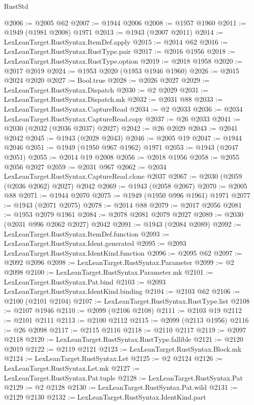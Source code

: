 \begin{lexlean}{RustStd}
\begin{coremodule}
@2006 := @2005 @62
@2007 := @1944 @2006
@2008 := @1957 @1960
@2011 := @1949 (@1981 @2008) @1971
@2013 := @1943 (@2007 @2011)
@2014 := LexLeanTarget.RustSyntax.ItemDef.apply
@2015 := @2014 @62
@2016 := LexLeanTarget.RustSyntax.RustType.pair
@2017 := @2016 @1956
@2018 := LexLeanTarget.RustSyntax.RustType.option
@2019 := @2018 @1958
@2020 := @2017 @2019
@2024 := @1953 @2020 (@1953 @1946 @1960)
@2026 := @2015 @2024 @2020
@2027 := Bool.true
@2028 := @2026 @2027
@2029 := LexLeanTarget.RustSyntax.Dispatch
@2030 := @2 @2029
@2031 := LexLeanTarget.RustSyntax.Dispatch.mk
@2032 := @2031 @88
@2033 := LexLeanTarget.RustSyntax.CaptureRead
@2034 := @2 @2033
@2036 := @2034 LexLeanTarget.RustSyntax.CaptureRead.copy
@2037 := @26 @2033
@2041 := @2030 (@2032 (@2036 @2037) @2027)
@2042 := @26 @2029
@2043 := @2041 @2042
@2045 := @1943 (@2028 @2043)
@2046 := @2005 @19
@2047 := @1944 @2046
@2051 := @1949 (@1950 @967 @1962) @1971
@2053 := @1943 (@2047 @2051)
@2055 := @2014 @19 @2008
@2056 := @2018 @1956
@2058 := @2055 @2056 @2027
@2059 := @2031 @967
@2062 := @2034 LexLeanTarget.RustSyntax.CaptureRead.clone @2037
@2067 := @2030 (@2059 (@2036 @2062) @2027) @2042
@2069 := @1943 (@2058 @2067)
@2070 := @2005 @88
@2071 := @1944 @2070
@2075 := @1949 (@1950 @996 @1961) @1971
@2077 := @1943 (@2071 @2075)
@2078 := @2014 @88
@2079 := @2017 @2056
@2081 := @1953 @2079 @1961
@2084 := @2078 @2081 @2079 @2027
@2089 := @2030 (@2031 @996 @2062 @2027) @2042
@2091 := @1943 (@2084 @2089)
@2092 := LexLeanTarget.RustSyntax.ItemDef.function
@2093 := LexLeanTarget.RustSyntax.Ident.generated
@2095 := @2093 LexLeanTarget.RustSyntax.IdentKind.function
@2096 := @2095 @62
@2097 := @2092 @2096
@2098 := LexLeanTarget.RustSyntax.Parameter
@2099 := @2 @2098
@2100 := LexLeanTarget.RustSyntax.Parameter.mk
@2101 := LexLeanTarget.RustSyntax.Pat.bind
@2103 := @2093 LexLeanTarget.RustSyntax.IdentKind.binding
@2104 := @2103 @62
@2106 := @2100 (@2101 @2104)
@2107 := LexLeanTarget.RustSyntax.RustType.list
@2108 := @2107 @1946
@2110 := @2099 (@2106 @2108)
@2111 := @2103 @19
@2112 := @2101 @2111
@2113 := @2100 @2112
@2115 := @2099 (@2113 @1956)
@2116 := @26 @2098
@2117 := @2115 @2116
@2118 := @2110 @2117
@2119 := @2097 @2118
@2120 := LexLeanTarget.RustSyntax.RustType.fallible
@2121 := @2120 @2019
@2122 := @2119 @2121
@2123 := LexLeanTarget.RustSyntax.Block.mk
@2124 := LexLeanTarget.RustSyntax.Let
@2125 := @2 @2124
@2126 := LexLeanTarget.RustSyntax.Let.mk
@2127 := LexLeanTarget.RustSyntax.Pat.tuple
@2128 := LexLeanTarget.RustSyntax.Pat
@2129 := @2 @2128
@2130 := LexLeanTarget.RustSyntax.Pat.wild
@2131 := @2129 @2130
@2132 := LexLeanTarget.RustSyntax.IdentKind.part

\end{coremodule}
\end{lexlean}
